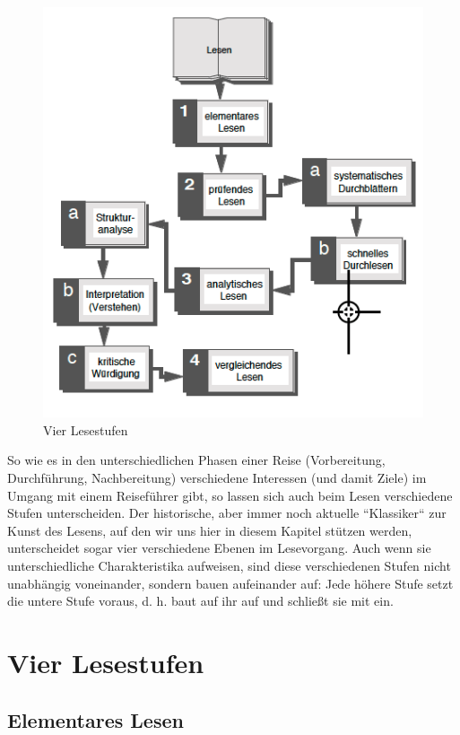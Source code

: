 \documentclass[]{book}
\theoremstyle{definition}
\theoremstyle{definition}
\theoremstyle{definition}
\theoremstyle{remark}
\begin{document}
\begin{figure}

{\centering \includegraphics{images/lesen-vier-stufen-min} 

}

\caption{Vier Lesestufen}\label{fig:unnamed-chunk-16}
\end{figure}

So wie es in den unterschiedlichen Phasen einer Reise (Vorbereitung,
Durchführung, Nachbereitung) verschiedene Interessen (und damit Ziele)
im Umgang mit einem Reiseführer gibt, so lassen sich auch beim Lesen
verschiedene Stufen unterscheiden. Der historische, aber immer noch
aktuelle ``Klassiker`` zur Kunst des Lesens, auf den wir uns hier in
diesem Kapitel stützen werden, unterscheidet sogar vier verschiedene
Ebenen im Lesevorgang. Auch wenn sie unterschiedliche Charakteristika
aufweisen, sind diese verschiedenen Stufen nicht unabhängig voneinander,
sondern bauen aufeinander auf: Jede höhere Stufe setzt die untere Stufe
voraus, d. h. baut auf ihr auf und schließt sie mit ein.

\section{Vier Lesestufen}\label{vier-lesestufen}

\subsection{Elementares Lesen}\label{elementares-lesen}
\end{document}
